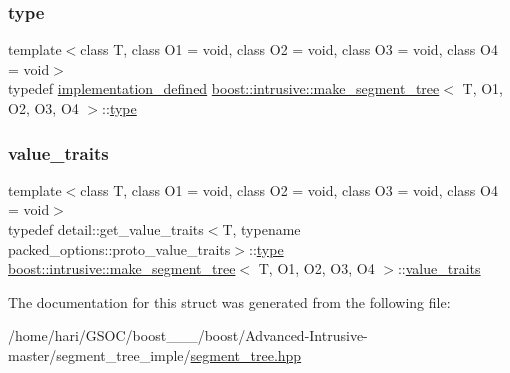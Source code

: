 \mbox{\label{structboost_1_1intrusive_1_1make__segment__tree_ac52c74ebd4a40dc2d3f2a37145bfe469}} 
\subsubsection{\texorpdfstring{type}{type}}
{\footnotesize\ttfamily template$<$class T, class O1 = void, class O2 = void, class O3 = void, class O4 = void$>$ \\
typedef \hyperlink{structboost_1_1intrusive_1_1make__segment__tree_a1a009d43964299a632641ecd7c2b0250}{implementation\+\_\+defined} \hyperlink{structboost_1_1intrusive_1_1make__segment__tree}{boost\+::intrusive\+::make\+\_\+segment\+\_\+tree}$<$ T, O1, O2, O3, O4 $>$\+::\hyperlink{structboost_1_1intrusive_1_1make__segment__tree_ac52c74ebd4a40dc2d3f2a37145bfe469}{type}}

\mbox{\label{structboost_1_1intrusive_1_1make__segment__tree_a865aca881f5d22f89580dc0692503bff}} 
\subsubsection{\texorpdfstring{value\+\_\+traits}{value\_traits}}
{\footnotesize\ttfamily template$<$class T, class O1 = void, class O2 = void, class O3 = void, class O4 = void$>$ \\
typedef detail\+::get\+\_\+value\+\_\+traits$<$T, typename packed\+\_\+options\+::proto\+\_\+value\+\_\+traits$>$\+::\hyperlink{structboost_1_1intrusive_1_1make__segment__tree_ac52c74ebd4a40dc2d3f2a37145bfe469}{type} \hyperlink{structboost_1_1intrusive_1_1make__segment__tree}{boost\+::intrusive\+::make\+\_\+segment\+\_\+tree}$<$ T, O1, O2, O3, O4 $>$\+::\hyperlink{structboost_1_1intrusive_1_1make__segment__tree_a865aca881f5d22f89580dc0692503bff}{value\+\_\+traits}}



The documentation for this struct was generated from the following file\+:\begin{DoxyCompactItemize}
\item 
/home/hari/\+G\+S\+O\+C/boost\+\_\+\_\+\_/boost/\+Advanced-\/\+Intrusive-\/master/segment\+\_\+tree\+\_\+imple/\hyperlink{segment__tree_8hpp}{segment\+\_\+tree.\+hpp}\end{DoxyCompactItemize}
